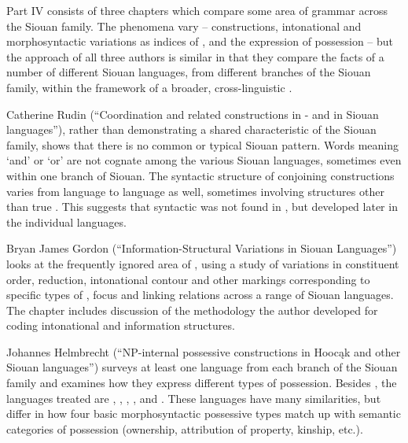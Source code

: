 \begin{refsection}

Part IV consists of three chapters which compare some area of grammar across the Siouan family. The phenomena vary --  constructions, intonational and morphosyntactic variations as indices of , and the expression of possession -- but the approach of all three authors is similar in that they compare the facts of a number of different Siouan languages, from different branches of the Siouan family, within the framework of a broader, cross-linguistic .

Catherine Rudin (``Coordination and related constructions in - and in Siouan languages''), rather than demonstrating a shared characteristic of the Siouan family, shows that there is no common or typical Siouan  pattern. Words meaning `and' or `or' are not cognate among the various Siouan languages, sometimes even within one branch of Siouan. The syntactic structure of conjoining constructions varies from language to language as well, sometimes involving structures other than true . This suggests that syntactic  was not found in , but developed later in the individual languages.

Bryan James Gordon (``Information-Structural Variations in Siouan Languages'') looks at the frequently ignored area of , using a  study of variations in constituent order, reduction, intonational contour and other markings corresponding to specific types of , focus and linking relations across a range of Siouan languages. The chapter includes discussion of the methodology the author developed for coding intonational and information structures.


Johannes Helmbrecht (``NP-internal possessive constructions in Hooc\k{a}k and other Siouan languages'') surveys at least one language from each branch of the Siouan family and examines how they express different types of possession. Besides , the languages treated are , , , ,  and . These languages have many similarities, but differ in how four basic morphosyntactic possessive types match up with semantic categories of possession (ownership, attribution of property, kinship, etc.).


 
\end{refsection}

